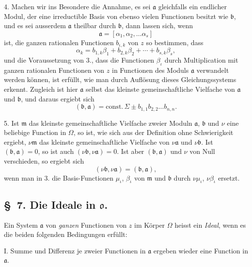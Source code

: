 \documentclass{article}
\begin{document}
4. Machen wir ins Besondere die Annahme, es sei $\mathfrak{a}$ gleichfalls ein endlicher Modul, der eine irreductible Basis von ebenso vielen Functionen besitzt wie $\mathfrak{b}$, und es sei ausserdem $\mathfrak{a}$ theilbar durch $\mathfrak{b}$, dann lassen sich, wenn
\[ \mathfrak{a} = [\alpha_{1}, \alpha_{2}, \ldots \alpha_{s}] \]
ist, die ganzen rationalen Functionen $b_{\iota,k}$ von $z$ so bestimmen, dass
\[ \alpha_{k} = b_{1,k}\beta_{1} + b_{2,k}\beta_{2} + \cdots + b_{s,k}\beta_{s}, \]
und die Voraussetzung von 3., dass die Functionen $\beta_{\iota}$ durch Multiplication mit ganzen rationalen Functionen von $z$ in Functionen des Moduls $\mathfrak{a}$ verwandelt werden können, ist erfüllt, wie man durch Auflösung dieses Gleichungssystems erkennt. Zugleich ist hier $\mathfrak{a}$ selbst das kleinste gemeinschaftliche Vielfache von $\mathfrak{a}$ und $\mathfrak{b}$, und daraus ergiebt sich
\[ (\mathfrak{b}, \mathfrak{a}) = \text{const.}\,\Sigma \pm b_{1,1}b_{2,2}\ldots b_{n,n}. \]

5. Ist $\mathfrak{m}$ das kleinste gemeinschaftliche Vielfache zweier Moduln $\mathfrak{a}$, $\mathfrak{b}$ und $\nu$ eine beliebige Function in $\Omega$, so ist, wie sich aus der Definition ohne Schwierigkeit ergiebt, $\nu\mathfrak{m}$ das kleinste gemeinschaftliche Vielfache von $\nu\mathfrak{a}$ und $\nu\mathfrak{b}$. Ist $(\mathfrak{b}, \mathfrak{a}) = 0$, so ist auch $(\nu\mathfrak{b}, \nu\mathfrak{a}) = 0$. Ist aber $(\mathfrak{b}, \mathfrak{a})$ und $\nu$ von Null verschieden, so ergiebt sich
\[ (\nu\mathfrak{b}, \nu\mathfrak{a}) = (\mathfrak{b}, \mathfrak{a}), \]
wenn man in 3. die Basis-Functionen $\mu_{\iota}$, $\beta_{\iota}$ von $\mathfrak{m}$ und $\mathfrak{b}$ durch $\nu\mu_{\iota}$, $\nu\beta_{\iota}$ ersetzt.

\subsection*{§~7. Die Ideale in $\mathfrak{o}$.}

Ein System $\mathfrak{a}$ von \emph{ganzen} Functionen von $z$ im Körper $\Omega$ heisst ein \emph{Ideal}, wenn es die beiden folgenden Bedingungen erfüllt:


I. Summe und Differenz je zweier Functionen in $\mathfrak{a}$ ergeben wieder eine Function in $\mathfrak{a}$.
\end{document}
